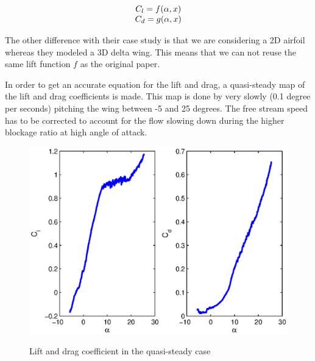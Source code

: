 \begin{equation}
  \begin{array}[c]{c}
    C_l=f(\alpha,x) \\
    C_d=g(\alpha,x)
  \end{array}
  \label{eqn:lift_drag_functions}
\end{equation}

\par The other difference with their case study is that we are considering a 2D airfoil whereas they modeled a 3D delta wing.
This means that we can not reuse the same lift function $f$ as the original paper.

\par In order to get an accurate equation for the lift and drag, a quasi-steady map of the lift and drag coefficients is made.
This map is done by very slowly (0.1 degree per seconds) pitching the wing between -5 and 25 degrees.
The free stream speed has to be corrected to account for the flow slowing down during the higher blockage ratio at high angle of attack.

\begin{figure}[ht]
  \begin{center}
    \scalebox{1.0}
    {\includegraphics{./Figures/Cd_and_Cl_NACA0009.eps}}
  \end{center}
  \caption{Lift and drag coefficient in the quasi-steady case}
  \label{fig:QS_Cl_Cd_vs_alpha}
\end{figure}

